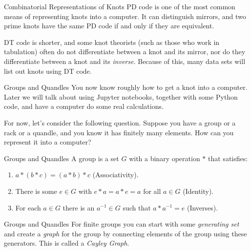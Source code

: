 \documentclass{beamer}
\begin{document}
    \begin{frame}{Combinatorial Representations of Knots}
        PD code is one of the most common means of representing knots into a
        computer. It can distinguish mirrors, and two prime knots have the same PD
        code if and only if they are equivalent.
        \par\hfill\par
        DT code is shorter, and some knot theorists (such as those who work in
        tabulation) often do not differentiate between a knot and its mirror,
        nor do they differentiate between a knot and its \textit{inverse}.
        Because of this, many data sets will list out knots using DT code.
    \end{frame}
    \begin{frame}{Groups and Quandles}
        You now know roughly how to get a knot into a computer. Later we will
        talk about using Jupyter notebooks, together with some Python code, and
        have a computer do some real calculations.
        \par\hfill\par
        For now, let's consider the following question. Suppose you have a group
        or a rack or a quandle, and you know it has finitely many elements.
        How can you represent it into a computer?
    \end{frame}
    \begin{frame}{Groups and Quandles}
        A group is a set $G$ with a binary operation $*$ that satisfies:
        \begin{enumerate}
            \item
                $a*(b*c)=(a*b)*c$ (Associativity).
            \item
                There is some $e\in{G}$ with $e*a=a*e=a$ for all $a\in{G}$
                (Identity).
            \item
                For each $a\in{G}$ there is an $a^{-1}\in{G}$ such that
                $a*a^{-1}=e$ (Inverses).
        \end{enumerate}
    \end{frame}
    \begin{frame}{Groups and Quandles}
        For finite groups you can start with some \textit{generating set} and
        create a \textit{graph} for the group by connecting elements of the group
        using these generators. This is called a \textit{Cayley Graph}.
    \end{frame}
\end{document}
